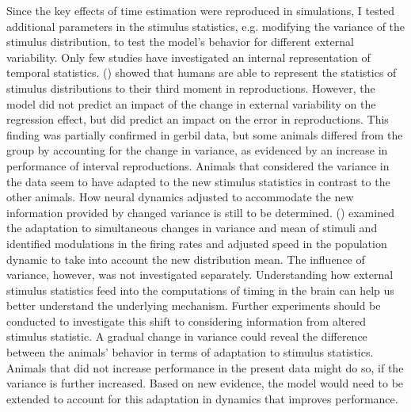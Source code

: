 \documentclass[10pt]{article}
\begin{document}
Since the key effects of time estimation were reproduced in simulations, I tested additional parameters in the stimulus statistics, e.g. modifying the variance of the stimulus distribution, to test the model's behavior for different external variability.
Only few studies have investigated an internal representation of temporal statistics. \citeauthor{Acerbi2012} (\citeyear{Acerbi2012}) showed that humans are able to represent the statistics of stimulus distributions to their third moment in reproductions.  
However, the model did not predict an impact of the change in external variability on the regression effect, but did predict an impact on the error in reproductions.
This finding was partially confirmed in gerbil data, but some animals differed from the group by accounting for the change in variance, as evidenced by an increase in performance of interval reproductions.
Animals that considered the variance in the data seem to have adapted to the new stimulus statistics in contrast to the other animals. 
How neural dynamics adjusted to accommodate the new information provided by changed variance is still to be determined.
\citeauthor{Meirhaeghe2021} (\citeyear{Meirhaeghe2021}) examined the adaptation to simultaneous changes in variance and mean of stimuli and identified modulations in the firing rates and adjusted speed in the population dynamic to take into account the new distribution mean. The influence of variance, however, was not investigated separately. 
Understanding how external stimulus statistics feed into the computations of timing in the brain can help us better understand the underlying mechanism. 
Further experiments should be conducted to investigate this shift to considering information from altered stimulus statistic. 
A gradual change in variance could reveal the difference between the animals' behavior in terms of adaptation to stimulus statistics.
Animals that did not increase performance in the present data might do so, if the variance is further increased.
Based on new evidence, the model would need to be extended to account for this adaptation in dynamics that improves performance.
\end{document}

